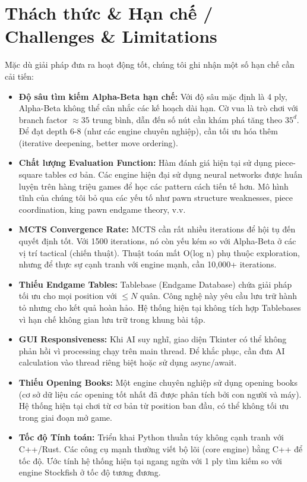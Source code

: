 \section{Thách thức \& Hạn chế / Challenges \& Limitations}

Mặc dù giải pháp đưa ra hoạt động tốt, chúng tôi ghi nhận một số hạn chế cần cải tiến:

\begin{itemize}
    \item \textbf{Độ sâu tìm kiếm Alpha-Beta hạn chế:} Với độ sâu mặc định là 4 ply, Alpha-Beta không thể cân nhắc các kế hoạch dài hạn. Cờ vua là trò chơi với branch factor $\approx 35$ trung bình, dẫn đến số nút cần khám phá tăng theo $35^d$. Để đạt depth 6-8 (như các engine chuyên nghiệp), cần tối ưu hóa thêm (iterative deepening, better move ordering).

    \item \textbf{Chất lượng Evaluation Function:} Hàm đánh giá hiện tại sử dụng piece-square tables cơ bản. Các engine hiện đại sử dụng neural networks được huấn luyện trên hàng triệu games để học các pattern cách tiến tế hơn. Mô hình tĩnh của chúng tôi bỏ qua các yếu tố như pawn structure weaknesses, piece coordination, king pawn endgame theory, v.v.

    \item \textbf{MCTS Convergence Rate:} MCTS cần rất nhiều iterations để hội tụ đến quyết định tốt. Với 1500 iterations, nó còn yếu kém so với Alpha-Beta ở các vị trí tactical (chiến thuật). Thuật toán mất O(log n) phụ thuộc exploration, nhưng để thực sự cạnh tranh với engine mạnh, cần 10,000+ iterations.

    \item \textbf{Thiếu Endgame Tables:} Tablebase (Endgame Database) chứa giải pháp tối ưu cho mọi position với $\leq N$ quân. Công nghệ này yêu cầu lưu trữ hành tỏ nhưng cho kết quả hoàn hảo. Hệ thống hiện tại không tích hợp Tablebases vì hạn chế không gian lưu trữ trong khung bài tập.

    \item \textbf{GUI Responsiveness:} Khi AI suy nghĩ, giao diện Tkinter có thể không phản hồi vì processing chạy trên main thread. Để khắc phục, cần đưa AI calculation vào thread riêng biệt hoặc sử dụng async/await.

    \item \textbf{Thiếu Opening Books:} Một engine chuyên nghiệp sử dụng opening books (cơ sở dữ liệu các opening tốt nhất đã được phân tích bởi con người và máy). Hệ thống hiện tại chơi từ cơ bản từ position ban đầu, có thể không tối ưu trong giai đoạn mở game.

    \item \textbf{Tốc độ Tính toán:} Triển khai Python thuần túy không cạnh tranh với C++/Rust. Các công cụ mạnh thường viết bộ lõi (core engine) bằng C++ để tốc độ. Ước tính hệ thống hiện tại ngang ngửa với 1 ply tìm kiếm so với engine Stockfish ở tốc độ tương đương.
\end{itemize}

